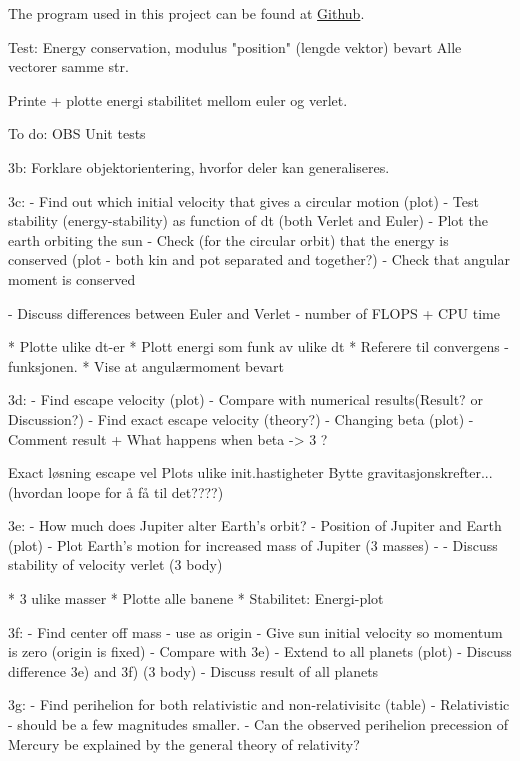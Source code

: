 


The program used in this project can be found at \href{https://github.com/kjetka/Project3}{Github}. 




Test: 		
Energy conservation, modulus "position" (lengde vektor) bevart
				Alle vectorer samme str.



	Printe + plotte energi stabilitet mellom euler og verlet.


To do:
	OBS Unit tests
	
	3b:
								Forklare objektorientering, hvorfor deler kan generaliseres. 
	
	3c: 					  
	- Find out which initial velocity that gives a circular motion (plot)
	- Test stability (energy-stability) as function of dt (both Verlet and Euler)
	- Plot the earth orbiting the sun
	- Check (for the circular orbit) that the energy is conserved (plot - both kin and pot separated and together?)
	- Check that angular moment is conserved
	
	- Discuss differences between Euler and Verlet
		- number of FLOPS + CPU time
	
	
 * Plotte ulike dt-er
 * Plott energi som funk av ulike dt
 * Referere til convergens - funksjonen.
 * Vise at angulærmoment bevart

	3d: 	
	- Find escape velocity (plot)
	 	- Compare with numerical results(Result? or Discussion?)
	- Find exact escape velocity (theory?)
	- Changing beta (plot)
		- Comment result + What happens when beta -> 3 ?
	
					  Exact løsning escape vel
								Plots ulike init.hastigheter
								Bytte gravitasjonskrefter... (hvordan loope for å få til det????)
								
	3e:
	- How much does Jupiter alter Earth's orbit?
	- Position of Jupiter and Earth (plot)	
	- Plot Earth's motion for increased mass of Jupiter (3 masses)
	- 
	- Discuss stability of velocity verlet (3 body)

 * 3 ulike masser
 * Plotte alle banene
 * Stabilitet: Energi-plot

	3f:
	- Find center off mass - use as origin
	- Give sun initial velocity so momentum is zero (origin is fixed)
	- Compare with 3e)
	- Extend to all planets (plot)
	- Discuss difference 3e) and 3f) (3 body)
	- Discuss result of all planets
	
	3g:
	- 	Find perihelion for both relativistic and non-relativisitc (table)
	- Relativistic - should be a few magnitudes smaller.	
	-  Can the observed perihelion
precession of Mercury be explained by the general theory of relativity?
	
